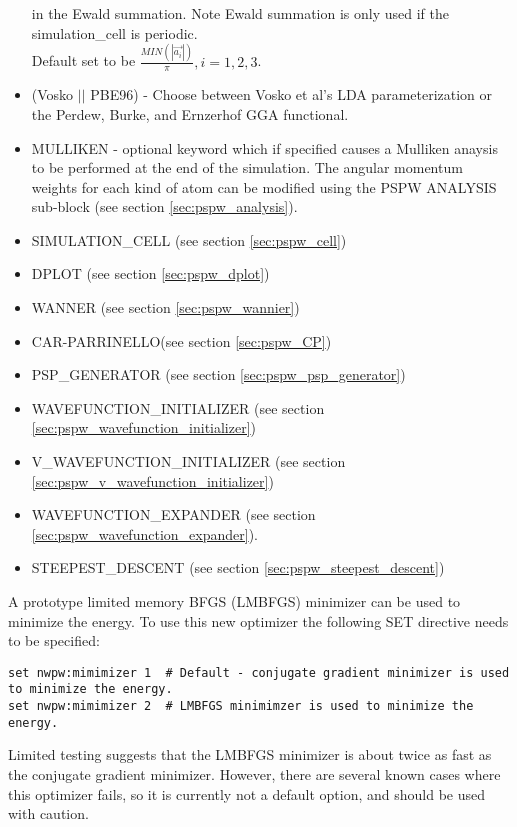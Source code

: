 \begin{itemize}
                          in the Ewald summation. Note Ewald summation
                          is only used if the simulation\_cell is periodic. \\
                           Default set to be
                          $\frac{MIN(\left| \vec{a_i} \right|)}{\pi}, i=1,2,3$.
        \item (Vosko $||$ PBE96) - Choose between Vosko et al's LDA 
                               parameterization or the Perdew, Burke, 
                               and Ernzerhof GGA functional.
        \item MULLIKEN - optional keyword which if specified
                         causes a Mulliken anaysis to be performed at
                         the end of the simulation.  The angular momentum
                         weights for each kind of atom can be modified using 
                         the PSPW ANALYSIS sub-block (see section \ref{sec:pspw_analysis}).

        \item SIMULATION\_CELL (see section \ref{sec:pspw_cell})
        \item DPLOT (see section \ref{sec:pspw_dplot})
	\item WANNER (see section \ref{sec:pspw_wannier})
        \item CAR-PARRINELLO(see section \ref{sec:pspw_CP})
        \item PSP\_GENERATOR (see section \ref{sec:pspw_psp_generator})
        \item WAVEFUNCTION\_INITIALIZER (see section \ref{sec:pspw_wavefunction_initializer})
        \item V\_WAVEFUNCTION\_INITIALIZER (see section \ref{sec:pspw_v_wavefunction_initializer})
        \item WAVEFUNCTION\_EXPANDER (see section \ref{sec:pspw_wavefunction_expander}).
        \item STEEPEST\_DESCENT (see section \ref{sec:pspw_steepest_descent})
\end{itemize}

A prototype limited memory BFGS (LMBFGS) minimizer can be used to minimize the energy.  To
use this new optimizer the following SET directive needs to be specified:
\begin{verbatim}
set nwpw:mimimizer 1  # Default - conjugate gradient minimizer is used to minimize the energy.
set nwpw:mimimizer 2  # LMBFGS minimimzer is used to minimize the energy.
\end{verbatim}
Limited testing suggests that the LMBFGS minimizer is about twice as fast as
the conjugate gradient minimizer.  However, there are several known cases
where this optimizer fails, so it is currently not a default option, and
should be used with caution.

